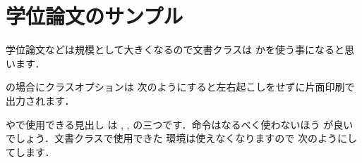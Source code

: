 \noindent \IOmargin {}


\section{学位論文のサンプル}

学位論文などは規模として大きくなるので文書クラスは
かを使う事になると思います．

の場合にクラスオプションは
次のようにすると左右起こしをせずに片面印刷で出力されます．


やで使用できる見出し
は ,  ,  
の三つです．命令はなるべく使わないほう
が良いでしょう．文書クラスで使用できた
環境は使えなくなりますので
次のようにしてします．

